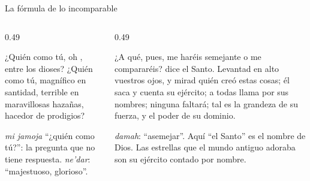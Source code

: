 \begin{frame}{La fórmula de lo incomparable}
\begin{columns}[t,onlytextwidth]
\begin{column}{0.49\textwidth}
\begin{cita}¿Quién como tú, oh \SENOR, entre los dioses? ¿Quién como tú, magnífico en santidad, terrible en maravillosas hazañas, hacedor de prodigios?\end{cita}
\scriptsize{}\par
\emph{mi jamoja} ``¿quién como tú?'': la pregunta que no tiene respuesta.  \emph{ne'dar}: ``majestuoso, glorioso''.
\end{column}
\begin{column}{0.49\textwidth}
\begin{cita}¿A qué, pues, me haréis semejante o me compararéis? dice el Santo. Levantad en alto vuestros ojos, y mirad quién creó estas cosas; él saca y cuenta su ejército; a todas llama por sus nombres; ninguna faltará; tal es la grandeza de su fuerza, y el poder de su dominio.\end{cita}
\scriptsize{}\par
{} \emph{damah}: ``asemejar''. Aquí ``el Santo'' es el nombre de Dios. Las estrellas que el mundo antiguo adoraba son su ejército contado por nombre.
\end{column}
\end{columns}
\end{frame}

